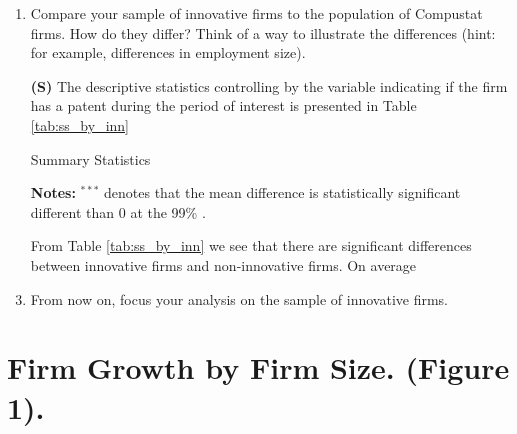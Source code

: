 \documentclass[12pt]{article}
\begin{document}
\begin{enumerate}[leftmargin=0pt, label=\textbf{(\alph*)}]
\item Compare your sample of innovative firms to the population of Compustat firms. How do they differ? Think of a way to illustrate the differences (hint: for example, differences in employment size).
\item[\textbf{(S)}] The descriptive statistics controlling by the variable indicating if the firm has a patent during the period of interest is presented in Table \ref{tab:ss_by_inn}
\begin{table}[htb]
\caption{Summary Statistics}
\label{tab:ss_by_inn}
\vspace*{-10pt}

\scriptsize{\textbf{Notes:} $^{***}$ denotes that the mean difference is statistically significant different than 0 at the 99\% . }
\end{table}
From Table \ref{tab:ss_by_inn} we see that there are significant differences between innovative firms and non-innovative firms. On average
\item From now on, focus your analysis on the sample of innovative firms. 

\end{enumerate}

\FloatBarrier
\section{Firm Growth by Firm Size. (Figure 1).}
\end{document}

